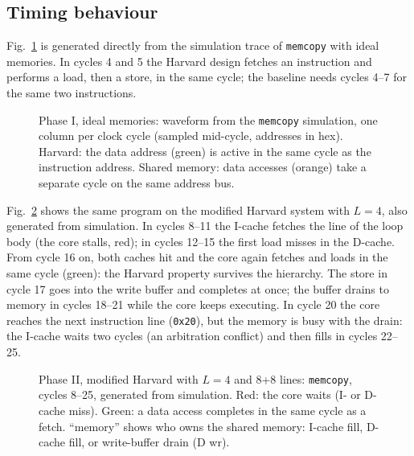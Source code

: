 \documentclass[conference]{IEEEtran}
\begin{document}
\subsection{Timing behaviour}
Fig.~\ref{fig:wave} is generated directly from the simulation trace of
\texttt{memcopy} with ideal memories. In cycles 4 and 5 the Harvard design
fetches an instruction and performs a load, then a store, in the same cycle;
the baseline needs cycles 4--7 for the same two instructions.

\begin{figure}[t]
\centering

\caption{Phase I, ideal memories: waveform from the \texttt{memcopy} simulation, one column per clock cycle (sampled mid-cycle, addresses in hex). Harvard: the data address (green) is active in the same cycle as the instruction address. Shared memory: data accesses (orange) take a separate cycle on the same address bus.}
\label{fig:wave}
\end{figure}

Fig.~\ref{fig:wavehier} shows the same program on the modified Harvard
system with $L=4$, also generated from simulation. In cycles 8--11 the
I-cache fetches the line of the loop body (the core stalls, red); in cycles
12--15 the first load misses in the D-cache. From cycle 16 on, both caches
hit and the core again fetches and loads in the same cycle (green): the
Harvard property survives the hierarchy. The store in cycle 17 goes into the
write buffer and completes at once; the buffer drains to memory in cycles
18--21 while the core keeps executing. In cycle 20 the core reaches the next
instruction line (\texttt{0x20}), but the memory is busy with the drain: the
I-cache waits two cycles (an arbitration conflict) and then fills in cycles
22--25.

\begin{figure}[t]
\centering

\caption{Phase II, modified Harvard with $L=4$ and 8+8 lines: \texttt{memcopy}, cycles 8--25, generated from simulation. Red: the core waits (I- or D-cache miss). Green: a data access completes in the same cycle as a fetch. ``memory'' shows who owns the shared memory: I-cache fill, D-cache fill, or write-buffer drain (D wr).}
\label{fig:wavehier}
\end{figure}
\end{document}
